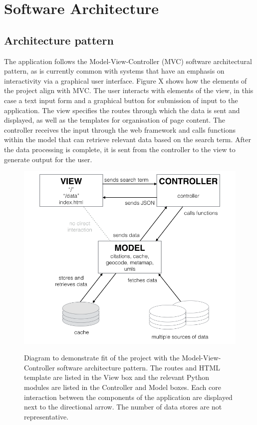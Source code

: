 \documentclass[Report.tex]{subfiles}
\begin{document}
\chapter{Software Architecture}
\section{Architecture pattern}
The application follows the Model-View-Controller (MVC) software architectural pattern, as is currently common with systems that have an emphasis on interactivity via a graphical user interface. Figure X shows how the elements of the project align with MVC. The user interacts with elements of the view, in this case a text input form and a graphical button for submission of input to the application. The view specifies the routes through which the data is sent and displayed, as well as the templates for organisation of page content\cite{mozilla_mvc}. The controller receives the input through the web framework and calls functions within the model that can retrieve relevant data based on the search term.  After the data processing is complete, it is sent from the controller to the view to generate output for the user. \newline

\begin{figure}[h!]
	\includegraphics[width=\textwidth]{../lib/images/mvc.png}
	\label{fig:mvc}
	\caption{Diagram to demonstrate fit of the project with the Model-View-Controller software architecture pattern. The routes and HTML template are listed in the View box and the relevant Python modules are listed in the Controller and Model boxes. Each core interaction between the components of the application are displayed next to the directional arrow. The number of data stores are not representative.}
\end{figure}
\end{document}
